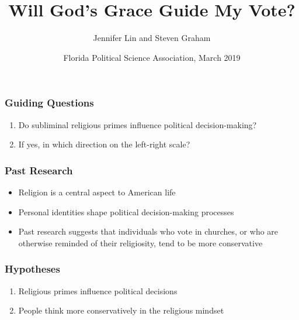 \documentclass[14pt]{beamer}
\begin{document}
\author[Lin, J., and Graham, S.] %
{Jennifer Lin and Steven Graham}
	\title{Will God’s Grace Guide My Vote?}
		
	\date[FPSA 2019]{Florida Political Science Association, March 2019}
	\begin{frame}[plain]
	\maketitle
\end{frame}

\begin{frame}
\frametitle{Guiding Questions}
\begin{enumerate}
	\item Do subliminal religious primes influence political decision-making?
	\item If yes, in which direction on the left-right scale?
\end{enumerate}
\end{frame}

\begin{frame}
\frametitle{Past Research}
\begin{itemize}
	\item Religion is a central aspect to American life
	\item Personal identities shape political decision-making processes
	\item Past research suggests that individuals who vote in churches, or who are otherwise reminded of their religiosity, tend to be more conservative
\end{itemize}
\end{frame}

\begin{frame}
\frametitle{Hypotheses}
\begin{enumerate}
	\item Religious primes influence political decisions
	\item People think more conservatively in the religious mindset
\end{enumerate}
\end{frame}
\end{document}
